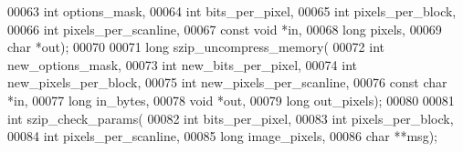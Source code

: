 \begin{DoxyCode}
00063     \textcolor{keywordtype}{int} options\_mask,
00064     \textcolor{keywordtype}{int} bits\_per\_pixel,
00065     \textcolor{keywordtype}{int} pixels\_per\_block,
00066     \textcolor{keywordtype}{int} pixels\_per\_scanline,
00067     \textcolor{keyword}{const} \textcolor{keywordtype}{void} *in,
00068     \textcolor{keywordtype}{long} pixels,
00069     \textcolor{keywordtype}{char} *out);
00070 
00071 \textcolor{keywordtype}{long} szip\_uncompress\_memory(
00072     \textcolor{keywordtype}{int} new\_options\_mask,
00073     \textcolor{keywordtype}{int} new\_bits\_per\_pixel,
00074     \textcolor{keywordtype}{int} new\_pixels\_per\_block,
00075     \textcolor{keywordtype}{int} new\_pixels\_per\_scanline, 
00076     \textcolor{keyword}{const} \textcolor{keywordtype}{char} *in,
00077     \textcolor{keywordtype}{long} in\_bytes,
00078     \textcolor{keywordtype}{void} *out,
00079     \textcolor{keywordtype}{long} out\_pixels);
00080 
00081 \textcolor{keywordtype}{int} szip\_check\_params(
00082     \textcolor{keywordtype}{int} bits\_per\_pixel,
00083     \textcolor{keywordtype}{int} pixels\_per\_block,
00084     \textcolor{keywordtype}{int} pixels\_per\_scanline,
00085     \textcolor{keywordtype}{long} image\_pixels,
00086     \textcolor{keywordtype}{char} **msg);
\end{DoxyCode}
